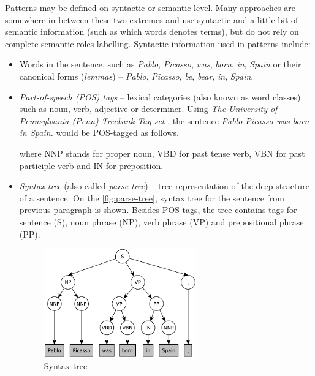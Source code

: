 \documentclass[12pt, twoside]{fithesis2}		%
\renewcommand{\_}{\leavevmode \kern0.07em\vbox{\hrule width0.4em}}
\newcommand{\squarebullet}{\textcolor{black}{\raisebox{0.15em}{\rule{4pt}{4pt}}}}
\newcommand{\emptysquarebullet}{\textcolor{black}{\raisebox{0.10em}{\tiny$\square$}}}
\newenvironment{myItemize}{
  \begin{itemize}[leftmargin=2em,rightmargin=1em,itemsep=\parskip ,parsep=0em,topsep=0em,partopsep=0em]
  \renewcommand{\labelitemi}{\squarebullet}
  \renewcommand{\labelitemii}{\textbullet}
}{
  \end{itemize}
}
\begin{document}
Patterns may be defined on syntactic or semantic level.
Many approaches are somewhere in between these two extremes and use syntactic and a little bit of semantic information (such as which words denotes terms), but do not rely on complete semantic roles labelling. Syntactic information used in patterns include:
\begin{myItemize}
  \item Words in the sentence, such as \emph{Pablo}, \emph{Picasso}, \emph{was}, \emph{born}, \emph{in}, \emph{Spain}
    or their canonical forms (\textit{lemmas}) -- \emph{Pablo}, \emph{Picasso}, \emph{be}, \emph{bear}, \emph{in}, \emph{Spain}.

  \item \textit{Part-of-speech (POS) tags} -- lexical categories (also known as word classes) such as noun, verb, adjective or determiner.
    Using \textit{The University of Pennsylvania (Penn) Treebank Tag-set} \cite{penn-tagset},
    the sentence \emph{Pablo Picasso was born in Spain.} would be POS-tagged as follows.
\begin{code}
\end{code}
    where NNP stands for proper noun, VBD for past tense verb, VBN for past participle verb and IN for preposition.

  \item \textit{Syntax tree} (also called \emph{parse tree}) -- tree representation of the deep stracture of a sentence.
    On the \autoref{fig:parse-tree}, syntax tree for the sentence from previous paragraph is shown.
    Besides POS-tags, the tree contains tags for sentence (S), noun phrase (NP), verb phrase (VP) and prepositional phrase (PP).
  \begin{figure}[h]
    \centering
    \includegraphics[width=0.62\textwidth]{images/parse-tree.pdf}
    \caption{Syntax tree}
    \label{fig:parse-tree}
  \end{figure}
\end{myItemize}
\end{document}
